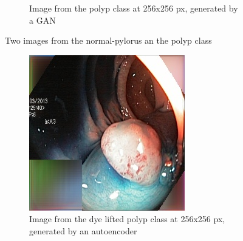\begin{figure}
\begin{subfigure}[t]{0.4\textwidth}
            \caption{Image from the polyp class at 256x256 px, generated by a GAN }    
            \label{fig:zGAN}
        \end{subfigure}
        \caption{Two images from the normal-pylorus an the polyp class} 
        \label{fig:GC1GREEN}
    \end{figure}
    
    \begin{figure}
        \centering
        \begin{subfigure}[t]{0.4\textwidth}
            \centering
            \includegraphics[width=\textwidth]{experiments/figures/both/DLAE.jpg}
            \caption{Image from the dye lifted polyp class at 256x256 px, generated by an autoencoder }    
            \label{fig:polypAEGREEN}
        \end{subfigure}
        \qquad
        \begin{subfigure}[t]{0.4\textwidth}  
            \centering 

\end{subfigure}
\end{figure}
